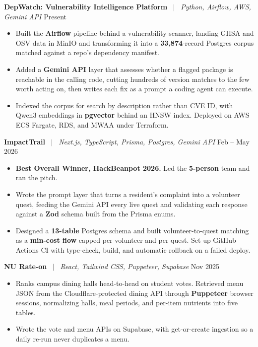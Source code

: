\documentclass[letterpaper,10pt]{article}
\newcommand{\entrysize}{\fontsize{10.5}{12}\selectfont}
\newif\ifentrygap
\newcommand{\entrygapsize}{6pt}
\newcommand{\entryfirstgap}{0.4pt}
\newcommand{\entrysep}{\ifentrygap\vspace{\entrygapsize}\else\vspace{\entryfirstgap}\fi\global\entrygaptrue}
\newcommand{\project}[3]{\entrysep{\entrysize\textbf{#1}} \ $\vert$ \ \textit{#2} \hfill #3}
\begin{document}
\project{DepWatch: Vulnerability Intelligence Platform}{Python, Airflow, AWS, Gemini API}{Present}
\begin{itemize}
  \item Built the \textbf{Airflow} pipeline behind a vulnerability scanner, landing GHSA and OSV data in MinIO and
        transforming it into a \textbf{33,874}-record Postgres corpus matched against a repo's dependency manifest.
  \item Added a \textbf{Gemini API} layer that assesses whether a flagged package is reachable in the calling code, cutting
        hundreds of version matches to the few worth acting on, then writes each fix as a prompt a coding agent can execute.
  \item Indexed the corpus for search by description rather than CVE ID, with Qwen3 embeddings in
        \textbf{pgvector} behind an HNSW index. Deployed on AWS ECS Fargate, RDS, and MWAA under Terraform.
\end{itemize}

\project{ImpactTrail}{Next.js, TypeScript, Prisma, Postgres, Gemini API}{Feb -- May 2026}
\begin{itemize}
  \item \textbf{Best Overall Winner, HackBeanpot 2026.} Led the \textbf{5-person} team and ran the pitch.
  \item Wrote the prompt layer that turns a resident's complaint into a volunteer quest, feeding the Gemini API every live
        quest and validating each response against a \textbf{Zod} schema built from the Prisma enums.
  \item Designed a \textbf{13-table} Postgres schema and built volunteer-to-quest matching as a \textbf{min-cost flow} capped per volunteer
        and per quest. Set up GitHub Actions CI with type-check, build, and automatic rollback on a failed deploy.
\end{itemize}

\project{NU Rate-on}{React, Tailwind CSS, Puppeteer, Supabase}{Nov 2025}
\begin{itemize}
  \item Ranks campus dining halls head-to-head on student votes. Retrieved menu JSON from the Cloudflare-protected dining
        API through \textbf{Puppeteer} browser sessions, normalizing halls, meal periods, and per-item nutrients into five tables.
  \item Wrote the vote and menu APIs on Supabase, with get-or-create ingestion so a daily re-run never duplicates a menu.
\end{itemize}
\end{document}
